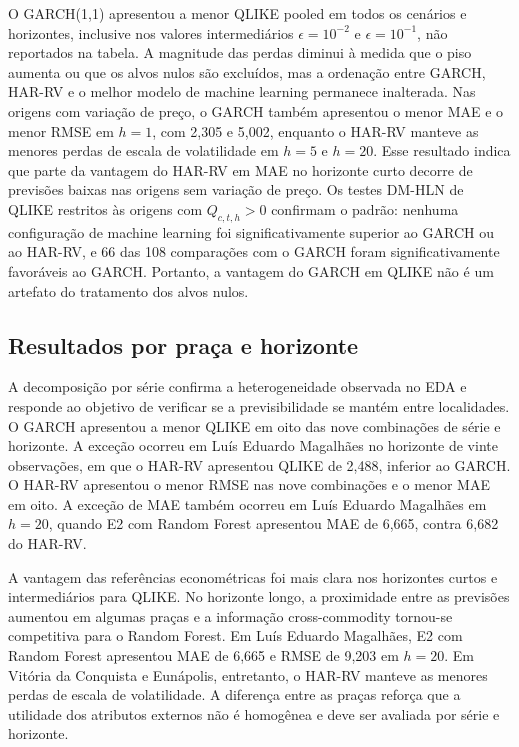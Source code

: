 \documentclass[a4paper,fleqn]{cas-sc}
\begin{document}
O GARCH(1,1) apresentou a menor QLIKE pooled em todos os cenários e horizontes, inclusive nos valores intermediários \(\epsilon=10^{-2}\) e \(\epsilon=10^{-1}\), não reportados na tabela. A magnitude das perdas diminui à medida que o piso aumenta ou que os alvos nulos são excluídos, mas a ordenação entre GARCH, HAR-RV e o melhor modelo de machine learning permanece inalterada. Nas origens com variação de preço, o GARCH também apresentou o menor MAE e o menor RMSE em \(h=1\), com 2,305 e 5,002, enquanto o HAR-RV manteve as menores perdas de escala de volatilidade em \(h=5\) e \(h=20\). Esse resultado indica que parte da vantagem do HAR-RV em MAE no horizonte curto decorre de previsões baixas nas origens sem variação de preço. Os testes DM-HLN de QLIKE restritos às origens com \(Q_{c,t,h}>0\) confirmam o padrão: nenhuma configuração de machine learning foi significativamente superior ao GARCH ou ao HAR-RV, e 66 das 108 comparações com o GARCH foram significativamente favoráveis ao GARCH. Portanto, a vantagem do GARCH em QLIKE não é um artefato do tratamento dos alvos nulos.

\subsection{Resultados por praça e horizonte}
\label{subsec:results_heterogeneity}

A decomposição por série confirma a heterogeneidade observada no EDA e responde ao objetivo de verificar se a previsibilidade se mantém entre localidades. O GARCH apresentou a menor QLIKE em oito das nove combinações de série e horizonte. A exceção ocorreu em Luís Eduardo Magalhães no horizonte de vinte observações, em que o HAR-RV apresentou QLIKE de 2,488, inferior ao GARCH. O HAR-RV apresentou o menor RMSE nas nove combinações e o menor MAE em oito. A exceção de MAE também ocorreu em Luís Eduardo Magalhães em \(h=20\), quando E2 com Random Forest apresentou MAE de 6,665, contra 6,682 do HAR-RV.

A vantagem das referências econométricas foi mais clara nos horizontes curtos e intermediários para QLIKE. No horizonte longo, a proximidade entre as previsões aumentou em algumas praças e a informação cross-commodity tornou-se competitiva para o Random Forest. Em Luís Eduardo Magalhães, E2 com Random Forest apresentou MAE de 6,665 e RMSE de 9,203 em \(h=20\). Em Vitória da Conquista e Eunápolis, entretanto, o HAR-RV manteve as menores perdas de escala de volatilidade. A diferença entre as praças reforça que a utilidade dos atributos externos não é homogênea e deve ser avaliada por série e horizonte.
\end{document}

